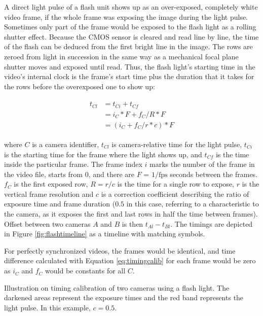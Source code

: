 
A direct light pulse of a flash unit shows up as an over-exposed, completely white video frame, if the whole frame was exposing the image during the light pulse.
Sometimes only part of the frame would be exposed to the flash light as a rolling shutter effect.
Because the CMOS sensor is cleared and read line by line, the time of the flash can be deduced from the first bright line in the image.
The rows are zeroed from light in succession in the same way as a mechanical focal plane shutter moves and exposed until read.
Thus, the flash light's starting time in the video's internal clock is the frame's start time plus the duration that it takes for the rows before the overexposed one to show up:

\begin{align} \begin{split} \label{eq:timingcalib}
t_{Cl} &= t_{Ci} + t_{Cf} \\
&= i_C * F + f_C / R * F \\
&= (i_C + f_C / r * c) * F
\end{split} \end{align}

where $C$ is a camera identifier, $t_{Cl}$ is camera-relative time for the light pulse, $t_{Ci}$ is the starting time for the frame where the light shows up, and $t_{Cf}$ is the time inside the particular frame.
The frame index $i$ marks the number of the frame in the video file, starts from 0, and there are $F$ = $1/\text{fps}$ seconds between the frames.
$f_C$ is the first exposed row, $R = r / c$ is the time for a single row to expose, $r$ is the vertical frame resolution and $c$ is a correction coefficient describing the ratio of exposure time and frame duration ($0.5$ in this case, referring to a characteristic to the camera, as it exposes the first and last rows in half the time between frames).
Offset between two cameras $A$ and $B$ is then $t_{Al} - t_{Bl}$.
The timings are depicted in Figure \ref{fig:flashtimeline} as a timeline with matching symbols.

For perfectly synchronized videos, the frames would be identical, and time difference calculated with Equation \ref{eq:timingcalib} for each frame would be zero as $i_C$ and $f_C$ would be constants for all $C$.

{Illustration on timing calibration of two cameras using a flash light.
The darkened areas represent the exposure times and the red band represents the light pulse.
In this example, $c = 0.5$.
}

